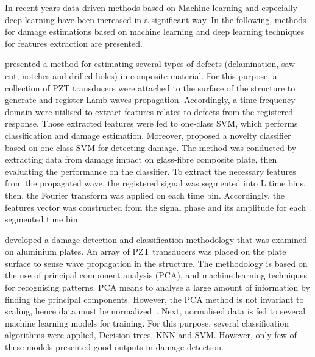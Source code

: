 In recent years data-driven methods based on Machine learning and especially deep learning have been increased in a significant way. 
In the following, methods for damage estimations based on machine learning and deep learning techniques for features extraction are presented. 

\textcite{Das2010} presented a method for estimating several types of defects (delamination, saw cut, notches and drilled holes) in composite material. For this purpose, a collection of PZT transducers were attached to the surface of the structure to generate and register Lamb waves propagation. 
Accordingly, a time-frequency domain were utilised to extract features relates to defects from the registered response. Those extracted features were fed to one-class SVM, which performs classification and damage estimation. 
Moreover, \textcite{Dib2018} proposed a novelty classifier based on one-class SVM for detecting damage. The method was conducted by extracting data from damage impact on glass-fibre composite plate, then evaluating the performance on the classifier. To extract the necessary features from the propagated wave, the registered signal was segmented into L time bins, then, the Fourier transform was applied on each time bin.
Accordingly, the features vector was constructed from the signal phase and its amplitude for each segmented time bin.

\textcite{Vitola2016} developed a damage detection and classification methodology that was examined on aluminium plates.
An array of PZT transducers was placed on the plate surface to sense wave propagation in the structure.
The methodology is based on the use of principal component analysis (PCA), and machine learning techniques for recognising patterns. 
PCA means to analyse a large amount of information by finding the principal components.
However, the PCA method is not invariant to scaling, hence data must be normalized~\cite{Tibaduiza2016}. 
Next, normalised data is fed to several machine learning models for training. 
For this purpose, several classification algorithms were applied, Decision trees, KNN and SVM. 
However, only few of these models presented good outputs in damage detection. 

